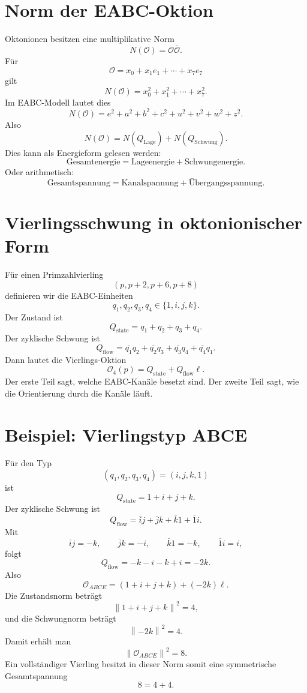 \documentclass[11pt,a4paper]{article}
\theoremstyle{definition}
\theoremstyle{plain}
\newcommand{\norm}[1]{\left\lVert #1 \right\rVert}
\newcommand{\conj}[1]{\overline{#1}}
\begin{document}
	\section{Norm der EABC-Oktion}
	
	Oktonionen besitzen eine multiplikative Norm
	\[
	N(\mathcal O)=\mathcal O\conj{\mathcal O}.
	\]
	Für
	\[
	\mathcal O=x_0+x_1e_1+\cdots+x_7e_7
	\]
	gilt
	\[
	N(\mathcal O)=x_0^2+x_1^2+\cdots+x_7^2.
	\]
	Im EABC-Modell lautet dies
	\[
	N(\mathcal O)=e^2+a^2+b^2+c^2+u^2+v^2+w^2+z^2.
	\]
	Also
	\[
	N(\mathcal O)
	=
	N(Q_{\mathrm{Lage}})+N(Q_{\mathrm{Schwung}}).
	\]
	Dies kann als Energieform gelesen werden:
	\[
	\text{Gesamtenergie}
	=
	\text{Lageenergie}
	+
	\text{Schwungenergie}.
	\]
	Oder arithmetisch:
	\[
	\text{Gesamtspannung}
	=
	\text{Kanalspannung}
	+
	\text{Übergangsspannung}.
	\]
	
	\section{Vierlingsschwung in oktonionischer Form}
	
	Für einen Primzahlvierling
	\[
	(p,p+2,p+6,p+8)
	\]
	definieren wir die EABC-Einheiten
	\[
	q_1,q_2,q_3,q_4\in\{1,i,j,k\}.
	\]
	Der Zustand ist
	\[
	Q_{\mathrm{state}}
	=
	q_1+q_2+q_3+q_4.
	\]
	Der zyklische Schwung ist
	\[
	Q_{\mathrm{flow}}
	=
	\conj{q_1}q_2+
	\conj{q_2}q_3+
	\conj{q_3}q_4+
	\conj{q_4}q_1.
	\]
	Dann lautet die Vierlings-Oktion
	\[
	\mathcal O_4(p)
	=
	Q_{\mathrm{state}}+Q_{\mathrm{flow}}\ell.
	\]
	Der erste Teil sagt, welche EABC-Kanäle besetzt sind. Der zweite Teil sagt, wie die Orientierung durch die Kanäle läuft.
	
	\section{Beispiel: Vierlingstyp ABCE}
	
	Für den Typ
	\[
	(q_1,q_2,q_3,q_4)=(i,j,k,1)
	\]
	ist
	\[
	Q_{\mathrm{state}}=1+i+j+k.
	\]
	Der zyklische Schwung ist
	\[
	Q_{\mathrm{flow}}
	=
	\conj{i}j+
	\conj{j}k+
	\conj{k}1+
	\conj{1}i.
	\]
	Mit
	\[
	\conj{i}j=-k,
	\qquad
	\conj{j}k=-i,
	\qquad
	\conj{k}1=-k,
	\qquad
	\conj{1}i=i,
	\]
	folgt
	\[
	Q_{\mathrm{flow}}=-k-i-k+i=-2k.
	\]
	Also
	\[
	\mathcal O_{ABCE}
	=
	(1+i+j+k)+(-2k)\ell.
	\]
	Die Zustandsnorm beträgt
	\[
	\norm{1+i+j+k}^2=4,
	\]
	und die Schwungnorm beträgt
	\[
	\norm{-2k}^2=4.
	\]
	Damit erhält man
	\[
	\norm{\mathcal O_{ABCE}}^2=8.
	\]
	Ein vollständiger Vierling besitzt in dieser Norm somit eine symmetrische Gesamtspannung
	\[
	8=4+4.
	\]
	
\end{document}

